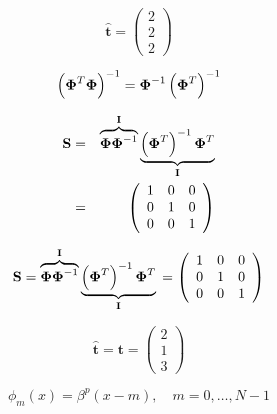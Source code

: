 \documentclass[10pt,twoside]{book}
\newcommand{\bldgr}[1]{{\mbox{\boldmath {${#1}$}}}} %
\newcommand{\fat}[1]{\mathbf{#1}} %
\newcommand{\transp}{^T} %
\begin{document}
$$
 \fat{\hat{t}}
  = 
\left(
               \begin{array}{c}
                 2 \\
                 2 \\
                 2
               \end{array}
             \right)
$$

$$ 
  \left( \bldgr{\Phi}\transp \bldgr{\Phi} \right)^{-1} 
  = \bldgr{\Phi}^{-1} \left( \bldgr{\Phi}\transp \right)^{-1}
$$

\begin{eqnarray*}
  \fat{S} 
  & = & 
  \overbrace{
  \bldgr{\Phi} \bldgr{\Phi}^{-1} }^{\fat{I}} 
  \underbrace{
  \left( \bldgr{\Phi}\transp \right)^{-1} \bldgr{\Phi}\transp }_{\fat{I}}
  \\
  & = &
\left(
               \begin{array}{ccc}
                 1 & 0 & 0\\
                 0 & 1 & 0 \\
                 0 & 0 & 1
               \end{array}
             \right)
\end{eqnarray*}

$$
\fat{S} 
=
  \overbrace{
  \bldgr{\Phi} \bldgr{\Phi}^{-1} }^{\fat{I}} 
  \underbrace{
  \left( \bldgr{\Phi}\transp \right)^{-1} \bldgr{\Phi}\transp }_{\fat{I}}
  \\
=
\left(
               \begin{array}{ccc}
                 1 & 0 & 0\\
                 0 & 1 & 0 \\
                 0 & 0 & 1
               \end{array}
             \right)
$$

$$
\fat{\hat{t}} = \fat{t} 
= \left(
               \begin{array}{c}
                 2 \\
                 1 \\
                 3
               \end{array}
             \right)
$$


$$
\phi_m( x ) = \beta^p( x - m ), \quad m=0, \ldots, N-1
$$
\end{document}
